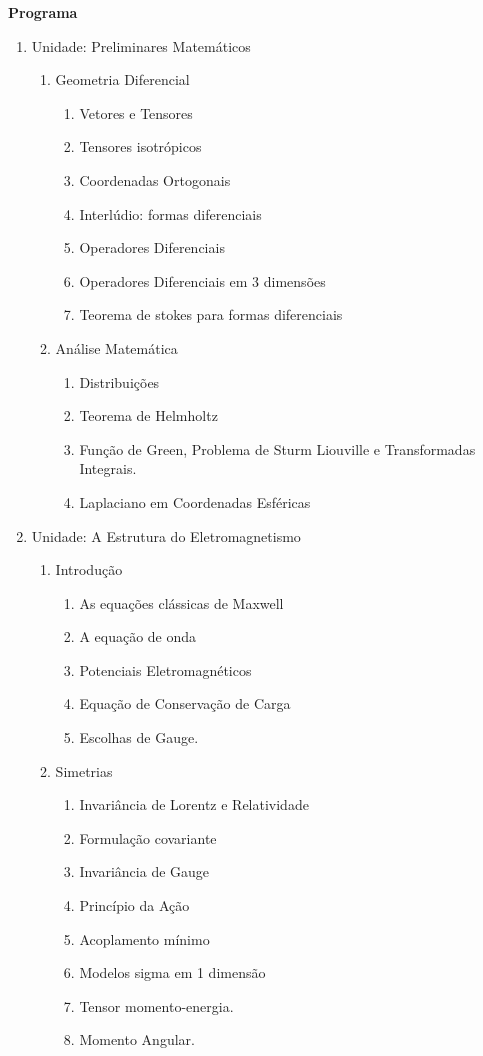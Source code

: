 \begin{framed}
\textbf{Programa}\\
\begin{enumerate}
\item Unidade: Preliminares Matemáticos\begin{enumerate}
\item Geometria Diferencial\begin{enumerate}
\item Vetores e Tensores
\item Tensores isotrópicos
\item Coordenadas Ortogonais
\item Interlúdio: formas diferenciais
\item Operadores Diferenciais
\item Operadores Diferenciais em 3 dimensões
\item Teorema de stokes para formas diferenciais
\end{enumerate}


\item Análise Matemática\begin{enumerate}
\item Distribuições
\item Teorema de Helmholtz
\item Função de Green, Problema de Sturm Liouville e Transformadas Integrais.
\item Laplaciano em Coordenadas Esféricas
\end{enumerate}
\end{enumerate}


\item Unidade: A Estrutura do Eletromagnetismo\begin{enumerate}
\item Introdução\begin{enumerate}
\item As equações clássicas de Maxwell
\item A equação de onda
\item Potenciais Eletromagnéticos
\item Equação de Conservação de Carga
\item Escolhas de Gauge.
\end{enumerate}


\item Simetrias\begin{enumerate}
\item Invariância de Lorentz e Relatividade
\item Formulação covariante
\item Invariância de Gauge
\item Princípio da Ação
\item Acoplamento mínimo
\item Modelos sigma em 1 dimensão
\item Tensor momento-energia.
\item Momento Angular.
\end{enumerate}
\end{enumerate}



\end{enumerate}
\end{framed}
